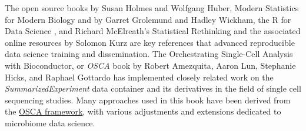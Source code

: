 \documentclass[
]{book}
\begin{document}
The open source books by Susan Holmes and Wolfgang Huber, Modern
Statistics for Modern Biology \citep{Holmes2019} and by Garret Grolemund
and Hadley Wickham, the R for Data Science \citep{Grolemund2017}, and
Richard McElreath's Statistical Rethinking and the associated online
resources by Solomon Kurz \citep{McElreath2020} are key references that
advanced reproducible data science training and dissemination. The
Orchestrating Single-Cell Analysis with Bioconductor, or \emph{OSCA} book
by Robert Amezquita, Aaron Lun, Stephanie Hicks, and Raphael Gottardo
\citep{Amezquita2020} has implemented closely related work on the
\emph{SummarizedExperiment} data container and its derivatives in the field
of single cell sequencing studies. Many approaches used in this book
have been derived from the \href{https://bioconductor.org/books/release/OSCA/}{OSCA
framework}, with various
adjustments and extensions dedicated to microbiome data science.

  
\end{document}
